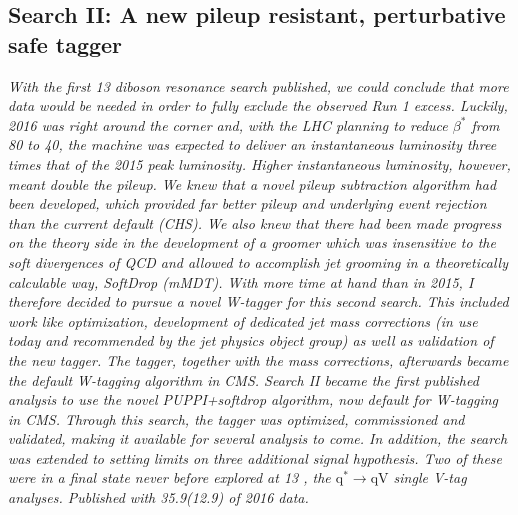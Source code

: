 \vspace*{\fill}
\begin{centering}
\section{Search II: A new pileup resistant, perturbative safe tagger}
\label{searchII}
\textit{
With the first 13 \TeV diboson resonance search published, we could conclude that more data would be needed in order to fully exclude the observed Run 1 excess. Luckily, 2016 was right around the corner and, with the LHC planning to reduce $\beta^*$ from 80 \cm to 40, the machine was expected to deliver an instantaneous luminosity three times that of the 2015 peak luminosity. Higher instantaneous luminosity, however, meant double the pileup.
\newline
\newline
We knew that a novel pileup subtraction algorithm had been developed, which provided far better pileup and underlying event rejection than the current default (CHS). We also knew that there had been made progress on the theory side in the development of a groomer which was insensitive to the soft divergences of QCD and allowed to accomplish jet grooming in a theoretically calculable way, SoftDrop (mMDT). With more time at hand than in 2015, I therefore decided to pursue a novel W-tagger for this second search. This included work like optimization, development of dedicated jet mass corrections (in use today and recommended by the jet physics object group) as well as validation of the new tagger. The tagger, together with the mass corrections, afterwards became the default W-tagging algorithm in CMS.
\newline
\newline
Search II became the first published analysis to use the novel PUPPI+softdrop algorithm, now default for W-tagging in CMS. Through this search, the tagger was optimized, commissioned and validated, making it available for several analysis to come. In addition, the search was extended to setting limits on three additional signal hypothesis. Two of these were in a final state never before explored at 13 \TeV, the $\textrm{q}^* \rightarrow \textrm{qV}$ single V-tag analyses. Published with 35.9(12.9) \fbinv of 2016 data.
}
\end{centering}
